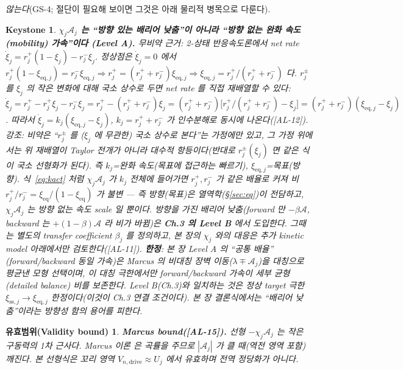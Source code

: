 \documentclass[11pt,a4paper]{article}
\newtheorem*{boundbox}{유효범위(Validity bound)}
\newtheorem*{keybox}{Keystone}
\newcommand{\eq}{\mathrm{eq}}
\newcommand{\drive}{\mathrm{drive}}
\newcommand{\AL}[1]{\textsf{[AL-#1]}}
\begin{document}
\emph{않는다}(GS-4; 절단이 필요해 보이면 그것은 아래 물리적 병목으로 다룬다).
\begin{keybox}
\textbf{$\chi_j\mathcal A_j$ 는 ``방향 있는 배리어 낮춤''이 아니라 ``방향 없는 완화 속도(mobility) 가속''이다
(Level A).} 무비약 근거: 2-상태 반응속도론에서 net rate $\dot\xi_j=r_j^+(1-\xi_j)-r_j^-\xi_j$. 정상점은
$\dot\xi_j=0$ 에서 $r_j^+(1-\xi_{\eq,j})=r_j^-\xi_{\eq,j}\Rightarrow r_j^+=(r_j^++r_j^-)\xi_{\eq,j}
\Rightarrow\xi_{\eq,j}=r_j^+/(r_j^++r_j^-)$ 다. $r_j^\pm$ 를 $\xi_j$ 의 작은 변화에 대해 국소 상수로 두면
net rate 를 직접 재배열할 수 있다: $\dot\xi_j=r_j^+-r_j^+\xi_j-r_j^-\xi_j=r_j^+-(r_j^++r_j^-)\xi_j
=(r_j^++r_j^-)\big[r_j^+/(r_j^++r_j^-)-\xi_j\big]=(r_j^++r_j^-)(\xi_{\eq,j}-\xi_j)$. 따라서
$\dot\xi_j=k_j(\xi_{\eq,j}-\xi_j)$, $k_j=r_j^++r_j^-$ 가 인수분해로 동시에 나온다(\AL{12}). \emph{강조}: 비약은
``$r_j^\pm$ 를 ($\xi_j$ 에 무관한) 국소 상수로 본다''는 \emph{가정}에만 있고, 그 가정 위에서는 위 재배열이 Taylor
전개가 아니라 대수적 항등이다(반대로 $r_j^\pm(\xi_j)$ 면 같은 식이 국소 선형화가 된다). 즉 $k_j$=완화 속도(목표에 접근하는 빠르기),
$\xi_{\eq,j}$=목표(방향). 식~\eqref{eq:kact} 처럼 $\chi_j\mathcal A_j$ 가 \emph{$k_j$
전체}에 들어가면 $r_j^+,r_j^-$ 가 같은 배율로 커져 비 $r_j^+/r_j^-=\xi_\eq/(1-\xi_\eq)$ 가 \emph{불변}
— 즉 방향(목표)은 열역학(\S\ref{sec:eq})이 전담하고, $\chi_j\mathcal A_j$ 는 방향 없는 속도 scale 일 뿐이다.
\emph{방향을 가진} 배리어 낮춤(forward 만 $-\beta\mathcal A$, backward 는 $+(1-\beta)\mathcal A$ 라 비가 바뀜)은 \textbf{Ch.3 의 Level B} 에서 도입한다.
그때는 별도의 transfer coefficient $\beta_j$ 를 정의하고, 본 장의 $\chi_j$ 와의 대응은 추가 kinetic model 아래에서만 검토한다(\AL{11}).
\textbf{한정}: 본 장 Level A 의 ``공통 배율''
(forward/backward 동일 가속)은 Marcus 의 \emph{비대칭} 장벽 이동($\lambda\mp\mathcal A_j$)을 대칭으로 평균낸
\emph{모형 선택}이며, 이 대칭 극한에서만 forward/backward 가속이 세부 균형(detailed balance) 비를 보존한다. Level B(Ch.3)와
일치하는 것은 \emph{정상 target 극한} $\xi_{\mathrm{ss},j}\to\xi_{\eq,j}$ 한정이다(이것이 Ch.3 연결 조건이다). 본 장
결론식에서는 ``배리어 낮춤''이라는 방향성 함의 용어를 피한다.
\end{keybox}
\begin{boundbox}
\textbf{Marcus bound(\AL{15}).} 선형 $-\chi_j\mathcal A_j$ 는 작은 구동력의 1차 근사다. Marcus 이론
\cite{marcus1956} 은 곡률을 주므로 $|\mathcal A_j|$ 가 클 때(역전 영역 포함) 깨진다. 본 선형식은 꼬리 영역
$V_{n,\drive}\approx U_j$ 에서 유효하며 전역 정당화가 아니다.
\end{boundbox}
\end{document}
